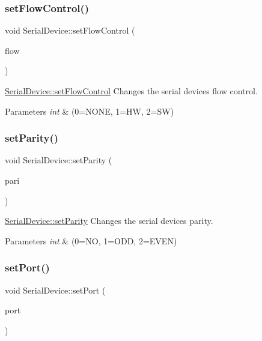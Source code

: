 \subsubsection{\texorpdfstring{set\+Flow\+Control()}{setFlowControl()}}
{\footnotesize\ttfamily void Serial\+Device\+::set\+Flow\+Control (\begin{DoxyParamCaption}\item[{int}]{flow }\end{DoxyParamCaption})}



\hyperlink{class_serial_device_a74968289347c6ede64587287bb0cf699}{Serial\+Device\+::set\+Flow\+Control} Changes the serial device\textquotesingle{}s flow control. 


\begin{DoxyParams}{Parameters}
{\em int} & (0=N\+O\+NE, 1=HW, 2=SW) \\
\hline
\end{DoxyParams}
\hypertarget{class_serial_device_a91e293977d5401ededf350e19846b5a1}{}\label{class_serial_device_a91e293977d5401ededf350e19846b5a1} 
\subsubsection{\texorpdfstring{set\+Parity()}{setParity()}}
{\footnotesize\ttfamily void Serial\+Device\+::set\+Parity (\begin{DoxyParamCaption}\item[{int}]{pari }\end{DoxyParamCaption})}



\hyperlink{class_serial_device_a91e293977d5401ededf350e19846b5a1}{Serial\+Device\+::set\+Parity} Changes the serial device\textquotesingle{}s parity. 


\begin{DoxyParams}{Parameters}
{\em int} & (0=NO, 1=O\+DD, 2=E\+V\+EN) \\
\hline
\end{DoxyParams}
\hypertarget{class_serial_device_a1440b389cc1bba66e9854a32a5807a8f}{}\label{class_serial_device_a1440b389cc1bba66e9854a32a5807a8f} 
\subsubsection{\texorpdfstring{set\+Port()}{setPort()}}
{\footnotesize\ttfamily void Serial\+Device\+::set\+Port (\begin{DoxyParamCaption}\item[{Q\+Serial\+Port\+Info}]{port }\end{DoxyParamCaption})}



